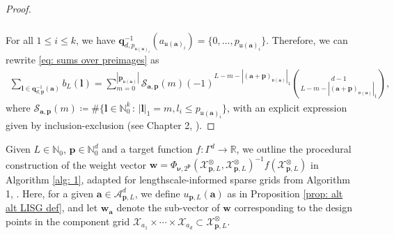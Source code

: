 \documentclass[pdflatex,sn-mathphys-num]{sn-jnl}%
\theoremstyle{thmstyleone}%
\theoremstyle{thmstyletwo}%
\theoremstyle{thmstylethree}%
\begin{document}
\begin{proof}
\begin{align}
\begin{split}
        \end{split}\label{eq: sums over preimages}
    \end{align}
    For all \(1\leq i \leq k\), we have \(\mathbf{q}_{d,p_{{\mathfrak{u}(\mathbf{a})}_i}}^{-1}(a_{\mathfrak{u}(\mathbf{a})_i})=\{0,\dots,p_{{\mathfrak{u}(\mathbf{a})}_i}\}\). Therefore, we can rewrite \eqref{eq: sums over preimages} as
    \begin{align}
        \sum_{\boldsymbol{l}\in \mathbf{q}_{d,\mathbf{p}}^{-1}(\mathbf{a})}b_{L}(\boldsymbol{l})=\sum_{m=0}^{|\mathbf{p}_{\mathfrak{u}(\mathbf{a})}|}\mathscr{S}_{\mathbf{a},\mathbf{p}}(m)(-1)^{L-m-|(\mathbf{a}+\mathbf{p})_{\mathfrak{v}(\mathbf{a})}|_1}\binom{d-1}{L-m-|(\mathbf{a}+\mathbf{p})_{\mathfrak{v}(\mathbf{a})}|_1},\nonumber
    \end{align}
    where \(\mathscr{S}_{\mathbf{a},\mathbf{p}}(m)\coloneqq\#\{\boldsymbol{l}\in\mathbb{N}_0^k\,:\,|\boldsymbol{l}|_1=m,l_i\leq p_{\mathfrak{u}(\mathbf{a})_i}\}\), with an explicit expression given by inclusion-exclusion (see Chapter 2, \cite{StanleyCombinatorics}).
\end{proof}
Given \(L\in\mathbb{N}_0\), \(\mathbf{p}\in\mathbb{N}_0^d\) and a target function \(f:\Gamma^d\rightarrow\mathbb{R}\), we outline the procedural construction of the weight vector \(\mathbf{w}=\Phi_{\boldsymbol{\nu},2^{\mathbf{p}}}(\mathcal{X}_{\mathbf{p},L}^{\otimes},\mathcal{X}_{\mathbf{p},L}^{\otimes})^{-1}f(\mathcal{X}_{\mathbf{p},L}^{\otimes})\) in Algorithm \ref{alg: 1}, adapted for lengthscale-informed sparse grids from Algorithm 1, \cite{Plumlee2014}. Here, for a given \(\boldsymbol{a}\in\mathcal{A}_{\mathbf{p},L}^d\), we define \(u_{\mathbf{p},L}(\mathbf{a})\) as in Proposition \ref{prop: alt alt LISG def}, and let \(\mathbf{w}_{\mathbf{a}}\) denote the sub-vector of \(\mathbf{w}\) corresponding to the design points in the component grid \(\mathcal{X}_{a_1}\times\cdots\times\mathcal{X}_{a_d}\subset\mathcal{X}^{\otimes}_{\mathbf{p},L}\).
\end{document}
